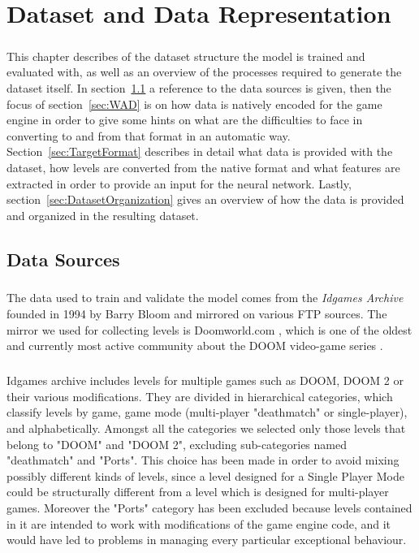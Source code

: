 \chapter{Dataset and Data Representation}
\paragraph{}
This chapter describes of the dataset structure the model is trained and evaluated with, as well as an overview of the processes required to generate the dataset itself.
In section~\ref{sec:Sources} a reference to the data sources is given, then the focus of section~\ref{sec:WAD} is on how data is natively encoded for the game engine in order to give some hints on what are the difficulties to face in converting to and from that format in an automatic way. Section~\ref{sec:TargetFormat} describes in detail what data is provided with the dataset, how levels are converted from the native format and what features are extracted in order to provide an input for the neural network. Lastly, section~\ref{sec:DatasetOrganization} gives an overview of how the data is provided and organized in the resulting dataset.
 
\section{Data Sources}
\label{sec:Sources}
\paragraph{} The data used to train and validate the model comes from the \textit{Idgames Archive} founded in 1994 by Barry Bloom \cite{idarchivehistory} and mirrored on various FTP sources. The mirror we used for collecting levels is Doomworld.com \cite{url:doomworld}, which is one of the oldest and currently most active community about the DOOM video-game series \cite{wiki:doomworld}.
\paragraph{} Idgames archive includes levels for multiple games such as DOOM, DOOM 2 or their various modifications. They are divided in hierarchical categories, which classify levels by game, game mode (multi-player "deathmatch" or single-player), and alphabetically.
Amongst all the categories we selected only those levels that belong to "DOOM" and "DOOM 2", excluding sub-categories named "deathmatch" and "Ports". This choice has been made in order to avoid mixing possibly different kinds of levels, since a level designed for a Single Player Mode could be structurally different from a level which is designed for multi-player games. Moreover the "Ports" category has been excluded because levels contained in it are intended to work with modifications of the game engine code, and it would have led to problems in managing every particular exceptional behaviour.

